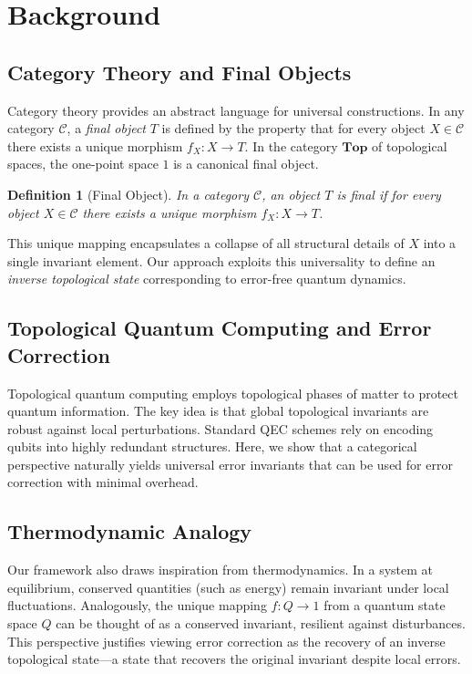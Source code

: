\documentclass[11pt]{article}
\newtheorem{definition}[theorem]{Definition}
\begin{document}
\section{Background}
\label{sec:background}

\subsection{Category Theory and Final Objects}
Category theory provides an abstract language for universal constructions. In any category \(\mathcal{C}\), a \emph{final object} \(T\) is defined by the property that for every object \(X\in \mathcal{C}\) there exists a unique morphism \(f_X: X\to T\). In the category \(\mathbf{Top}\) of topological spaces, the one-point space \(1\) is a canonical final object.

\begin{definition}[Final Object]
In a category \(\mathcal{C}\), an object \(T\) is final if for every object \(X \in \mathcal{C}\) there exists a unique morphism \(f_X: X \to T\).
\end{definition}

This unique mapping encapsulates a collapse of all structural details of \(X\) into a single invariant element. Our approach exploits this universality to define an \emph{inverse topological state} corresponding to error-free quantum dynamics.

\subsection{Topological Quantum Computing and Error Correction}
Topological quantum computing employs topological phases of matter to protect quantum information. The key idea is that global topological invariants are robust against local perturbations. Standard QEC schemes rely on encoding qubits into highly redundant structures. Here, we show that a categorical perspective naturally yields universal error invariants that can be used for error correction with minimal overhead.

\subsection{Thermodynamic Analogy}
Our framework also draws inspiration from thermodynamics. In a system at equilibrium, conserved quantities (such as energy) remain invariant under local fluctuations. Analogously, the unique mapping \(f: Q \to 1\) from a quantum state space \(Q\) can be thought of as a conserved invariant, resilient against disturbances. This perspective justifies viewing error correction as the recovery of an inverse topological state—a state that recovers the original invariant despite local errors.
\end{document}
